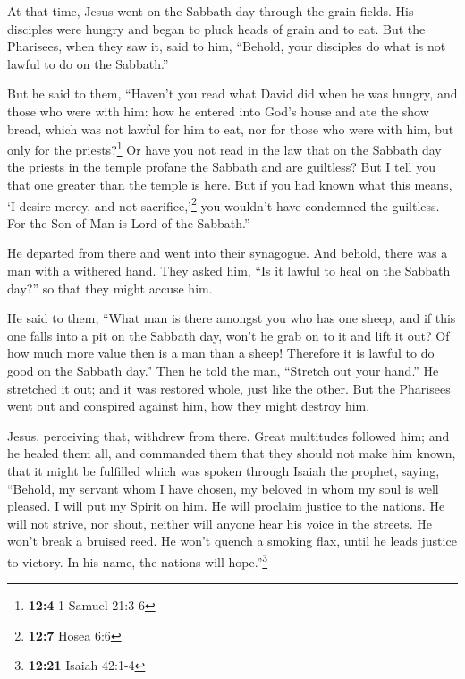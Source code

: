  At that time, Jesus went on the Sabbath day through the
grain fields. His disciples were hungry and began to pluck heads of
grain and to eat.  But the Pharisees, when they saw it,
said to him, ``Behold, your disciples do what is not lawful to do on the
Sabbath.''

 But he said to them, ``Haven't you read what David did
when he was hungry, and those who were with him:  how he
entered into God's house and ate the show bread, which was not lawful
for him to eat, nor for those who were with him, but only for the
priests?\footnote{\textbf{12:4} 1 Samuel 21:3-6}  Or have
you not read in the law that on the Sabbath day the priests in the
temple profane the Sabbath and are guiltless?  But I tell
you that one greater than the temple is here.  But if you
had known what this means, `I desire mercy, and not
sacrifice,'\footnote{\textbf{12:7} Hosea 6:6} you wouldn't have
condemned the guiltless.  For the Son of Man is Lord of
the Sabbath.''

 He departed from there and went into their synagogue.
 And behold, there was a man with a withered hand. They
asked him, ``Is it lawful to heal on the Sabbath day?'' so that they
might accuse him.

 He said to them, ``What man is there amongst you who has
one sheep, and if this one falls into a pit on the Sabbath day, won't he
grab on to it and lift it out?  Of how much more value
then is a man than a sheep! Therefore it is lawful to do good on the
Sabbath day.''  Then he told the man, ``Stretch out your
hand.'' He stretched it out; and it was restored whole, just like the
other.  But the Pharisees went out and conspired against
him, how they might destroy him.

 Jesus, perceiving that, withdrew from there. Great
multitudes followed him; and he healed them all,  and
commanded them that they should not make him known,  that
it might be fulfilled which was spoken through Isaiah the prophet,
saying,  ``Behold, my servant whom I have chosen, my
beloved in whom my soul is well pleased. I will put my Spirit on him. He
will proclaim justice to the nations.  He will not
strive, nor shout, neither will anyone hear his voice in the streets.
 He won't break a bruised reed. He won't quench a smoking
flax, until he leads justice to victory.  In his name,
the nations will hope.''\footnote{\textbf{12:21} Isaiah 42:1-4}

